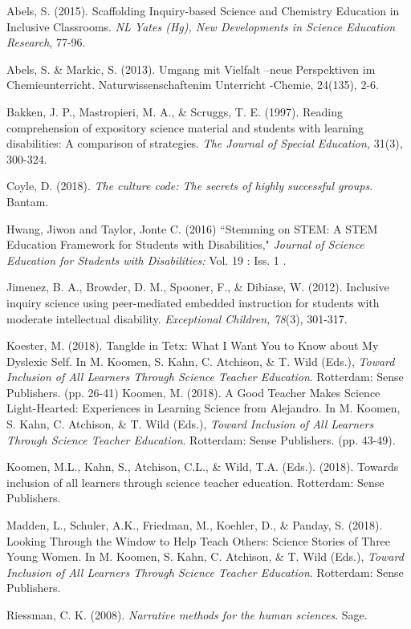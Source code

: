 \documentclass[11pt]{sig-alternate}
\begin{document}
\begin{large}
\leftskip 0.25in
\parindent -0.25in 
Abels, S. (2015). Scaffolding Inquiry-based Science and Chemistry Education in Inclusive Classrooms. \textit{NL Yates (Hg), New Developments in Science Education Research}, 77-96.

Abels, S. \& Markic, S. (2013). Umgang mit Vielfalt –neue Perspektiven im Chemieunterricht. Naturwissenschaftenim Unterricht -Chemie, 24(135), 2-6.

Bakken, J. P., Mastropieri, M. A., \& Scruggs, T. E. (1997). Reading comprehension of expository science material and students with learning disabilities: A comparison of strategies. \textit{The Journal of Special Education,} 31(3), 300-324. 

Coyle, D. (2018). \textit{The culture code: The secrets of highly successful groups}. Bantam.

Hwang, Jiwon and Taylor, Jonte C. (2016) ``Stemming on STEM: A STEM Education Framework for Students with Disabilities," \textit{Journal of Science Education for Students with Disabilities:} Vol. 19 : Iss. 1 .

Jimenez, B. A., Browder, D. M., Spooner, F., \& Dibiase, W. (2012). Inclusive inquiry science using peer-mediated embedded instruction for students with moderate intellectual disability. \textit{Exceptional Children, 78}(3), 301-317.

Koester, M. (2018). Tanglde in Tetx: What I Want You to Know about My Dyslexic Self. In M. Koomen, S. Kahn, C. Atchison, \& T. Wild (Eds.), \textit{Toward Inclusion of All Learners Through Science Teacher Education}. Rotterdam: Sense Publishers. (pp. 26-41)
\newpage
Koomen, M. (2018). A Good Teacher Makes Science Light-Hearted: Experiences in Learning Science from Alejandro. In M. Koomen, S. Kahn, C. Atchison, \& T. Wild (Eds.), \textit{Toward Inclusion of All Learners Through Science Teacher Education}. Rotterdam: Sense Publishers.
 (pp. 43-49).

Koomen, M.L., Kahn, S., Atchison, C.L., \& Wild, T.A. (Eds.). (2018). Towards inclusion of all learners through science teacher education. Rotterdam: Sense Publishers.

Madden, L., Schuler, A.K., Friedman, M., Koehler, D., \& Panday, S. (2018). Looking Through the Window to Help Teach Others: Science Stories of Three Young Women. In M. Koomen, S. Kahn, C. Atchison, \& T. Wild (Eds.), \textit{Toward Inclusion of All Learners Through Science Teacher Education}. Rotterdam: Sense Publishers.

Riessman, C. K. (2008). \textit{Narrative methods for the human sciences}. Sage.


\end{large}
\end{document}
